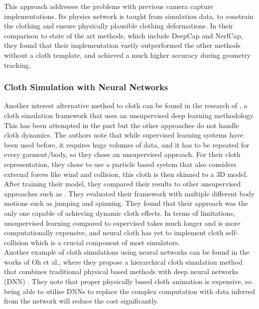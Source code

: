 \documentclass[12pt,a4paper]{article}
\begin{document}
This approach addresses the problems with previous camera capture implementations. Its physics network is taught from simulation data, to constrain the clothing and ensure physically plausible clothing deformations.
In their comparison to state of the art methods, which include DeepCap and NerfCap, they found that their implementation vastly outperformed the other methods without a cloth template, and achieved a much higher accuracy during geometry tracking.


\subsubsection{Cloth Simulation with Neural Networks}
Another interest alternative method to cloth can be found in the research of \cite{neuralCloth}, a cloth simulation framework that uses an unsupervised deep learning methodology. This has been attempted in the past but the other approaches do not handle cloth dynamics. The authors note that while supervised learning systems have been used before, it requires huge volumes of data, and it has to be repeated for every garment/body, so they chose an unsupervised approach. For their cloth representation, they chose to use a particle based system that also considers external forces like wind and collision, this cloth is then skinned to a 3D model. After training their model, they compared their results to other unsupervised approaches such as \cite{bertiche2021pbns}. They evaluated their framework with multiple different body motions such as jumping and spinning. They found that their approach was the only one capable of achieving dynamic cloth effects. In terms of limitations, unsupervised learning compared to supervised takes much longer and is more computationally expensive, and neural cloth has yet to implement cloth self-collision which is a crucial component of most simulators.
\\

Another example of cloth simulations using neural networks can be found in the works of Oh et al., where they propose a hierarchical cloth simulation method that combines traditional physical based methods with deep neural networks (DNN) \cite{OhNeural}. They note that proper physically based cloth animation is expensive, so being able to utilise DNNs to replace the complex computation with data inferred from the network will reduce the cost significantly.
\end{document}

